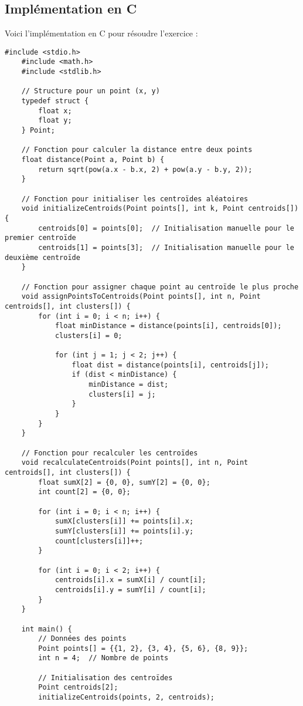 \subsection*{Implémentation en C}

Voici l'implémentation en C pour résoudre l'exercice :

\begin{lstlisting}[caption=Implémentation de l'algorithme K-means en C]
	#include <stdio.h>
	#include <math.h>
	#include <stdlib.h>
	
	// Structure pour un point (x, y)
	typedef struct {
		float x;
		float y;
	} Point;
	
	// Fonction pour calculer la distance entre deux points
	float distance(Point a, Point b) {
		return sqrt(pow(a.x - b.x, 2) + pow(a.y - b.y, 2));
	}
	
	// Fonction pour initialiser les centroïdes aléatoires
	void initializeCentroids(Point points[], int k, Point centroids[]) {
		centroids[0] = points[0];  // Initialisation manuelle pour le premier centroïde
		centroids[1] = points[3];  // Initialisation manuelle pour le deuxième centroïde
	}
	
	// Fonction pour assigner chaque point au centroïde le plus proche
	void assignPointsToCentroids(Point points[], int n, Point centroids[], int clusters[]) {
		for (int i = 0; i < n; i++) {
			float minDistance = distance(points[i], centroids[0]);
			clusters[i] = 0;
			
			for (int j = 1; j < 2; j++) {
				float dist = distance(points[i], centroids[j]);
				if (dist < minDistance) {
					minDistance = dist;
					clusters[i] = j;
				}
			}
		}
	}
	
	// Fonction pour recalculer les centroïdes
	void recalculateCentroids(Point points[], int n, Point centroids[], int clusters[]) {
		float sumX[2] = {0, 0}, sumY[2] = {0, 0};
		int count[2] = {0, 0};
		
		for (int i = 0; i < n; i++) {
			sumX[clusters[i]] += points[i].x;
			sumY[clusters[i]] += points[i].y;
			count[clusters[i]]++;
		}
		
		for (int i = 0; i < 2; i++) {
			centroids[i].x = sumX[i] / count[i];
			centroids[i].y = sumY[i] / count[i];
		}
	}
	
	int main() {
		// Données des points
		Point points[] = {{1, 2}, {3, 4}, {5, 6}, {8, 9}};
		int n = 4;  // Nombre de points
		
		// Initialisation des centroïdes
		Point centroids[2];
		initializeCentroids(points, 2, centroids);
		

\end{lstlisting}
